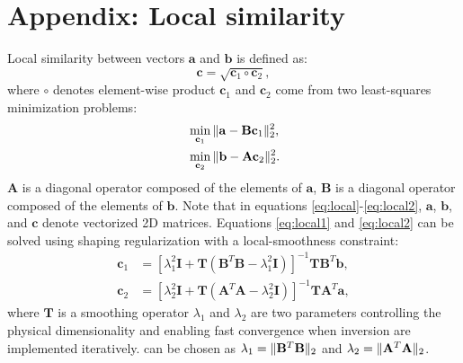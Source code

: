 \section{Appendix: Local similarity}
 Local similarity between vectors $\mathbf{a}$ and $\mathbf{b}$ is defined as:
\begin{equation}
\label{eq:local}
\mathbf{c}=\sqrt{\mathbf{c}_1\circ\mathbf{c}_2},
\end{equation}
where $\circ$ denotes element-wise product\dlo{,} $\mathbf{c}_1$ and $\mathbf{c}_2$ come from two least-squares minimization problems:
\begin{align}
\label{eq:local1}
&\min_{\mathbf{c}_1}\Arrowvert \mathbf{a}-\mathbf{B} \mathbf{c}_1 \Arrowvert_2^2, \\
\label{eq:local2}
&\min_{\mathbf{c}_2}\Arrowvert \mathbf{b}-\mathbf{A} \mathbf{c}_2 \Arrowvert_2^2.
\end{align}
 $\mathbf{A}$ is a diagonal operator composed of the elements of $\mathbf{a}$, $\mathbf{B}$ is a diagonal operator composed of the elements of $\mathbf{b}$. Note that in equations \ref{eq:local}-\ref{eq:local2}, $\mathbf{a}$, $\mathbf{b}$, and $\mathbf{c}$  denote vectorized 2D matrices. Equations \ref{eq:local1} and \ref{eq:local2} can be solved using shaping regularization with a local-smoothness constraint:
\begin{align}
\label{eq:local3}
\mathbf{c}_1 &= [\lambda_1^2\mathbf{I} + \mathbf{T}(\mathbf{B}^T\mathbf{B}-\lambda_1^2\mathbf{I})]^{-1}\mathbf{TB}^T\mathbf{b},\\
\label{eq:local4}
\mathbf{c}_2 &= [\lambda_2^2\mathbf{I} + \mathbf{T}(\mathbf{A}^T\mathbf{A}-\lambda_2^2\mathbf{I})]^{-1}\mathbf{TA}^T\mathbf{a},
\end{align}
where $\mathbf{T}$ is a smoothing operator\wen{,} $\lambda_1$ and $\lambda_2$ are two parameters controlling the physical dimensionality and enabling fast convergence when inversion  are implemented iteratively.  can be chosen as $\lambda_1  = \Arrowvert\mathbf{B}^T\mathbf{B}\Arrowvert_2$ and $\lambda_2  = \Arrowvert\mathbf{A}^T\mathbf{A}\Arrowvert_2$.









